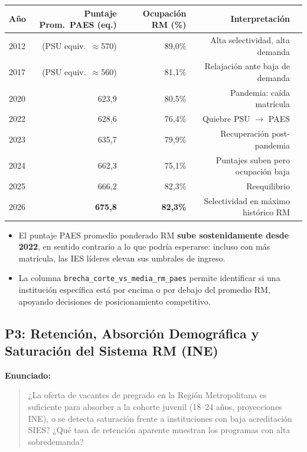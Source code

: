 \documentclass[11pt,a4paper]{article}
\begin{document}
\begin{center}\small
\begin{tabular}{@{}lrrrr@{}}
\toprule
\textbf{Año} & \textbf{Puntaje Prom.\ PAES (eq.)} &
\textbf{Ocupación RM (\%)} & \textbf{Interpretación} \\
\midrule
2012 & (PSU equiv.\ $\approx$570) & 89,0\% & Alta selectividad, alta demanda \\
2017 & (PSU equiv.\ $\approx$560) & 81,1\% & Relajación ante baja de demanda \\
2020 & 623,9 & 80,5\% & Pandemia: caída matrícula \\
2022 & 628,6 & 76,4\% & Quiebre PSU $\to$ PAES \\
2023 & 635,7 & 79,9\% & Recuperación post-pandemia \\
2024 & 662,3 & 75,1\% & Puntajes suben pero ocupación baja \\
2025 & 666,2 & 82,3\% & Reequilibrio \\
2026 & \textbf{675,8} & \textbf{82,3\%} & Selectividad en máximo histórico RM \\
\bottomrule
\end{tabular}
\end{center}

\begin{itemize}[leftmargin=*]
  \item El puntaje PAES promedio ponderado RM \textbf{sube sostenidamente desde 2022},
        en sentido contrario a lo que podría esperarse: incluso con más matrícula,
        las IES líderes elevan sus umbrales de ingreso.
  \item La columna \texttt{brecha\_corte\_vs\_media\_rm\_paes} permite identificar
        si una institución específica está por encima o por debajo del promedio RM,
        apoyando decisiones de posicionamiento competitivo.
\end{itemize}

\subsection{P3: Retención, Absorción Demográfica y Saturación del Sistema RM (INE)}

\textbf{Enunciado:}
\begin{quote}
¿La oferta de vacantes de pregrado en la Región Metropolitana es suficiente para
absorber a la cohorte juvenil (18--24 años, proyecciones INE), o se detecta
saturación frente a instituciones con baja acreditación SIES? ¿Qué tasa de
retención aparente muestran los programas con alta sobredemanda?
\end{quote}
\end{document}
